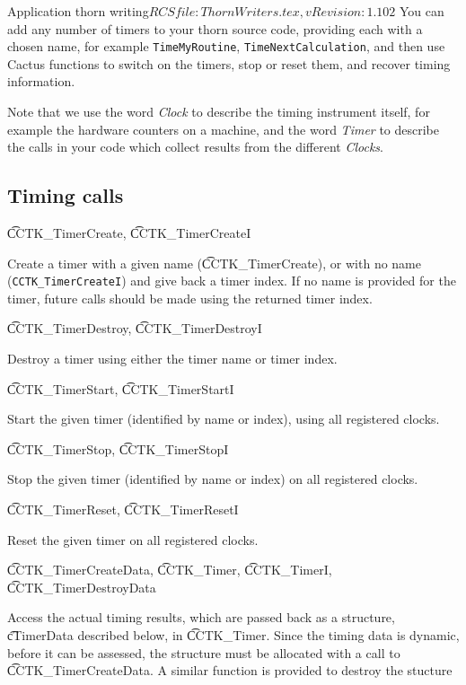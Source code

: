 \begin{cactuspart}{2}{Application thorn writing}{$RCSfile: ThornWriters.tex,v $}{$Revision: 1.102 $}
You can add any number of timers to your thorn source code, providing
each with a chosen name, for example {\tt TimeMyRoutine}, {\tt TimeNextCalculation}, and then use Cactus functions to switch on the
timers, stop or reset them, and recover timing information.

Note that we use the word {\it Clock} to describe the timing instrument
itself, for example the hardware counters on a machine, and the word
{\it Timer} to describe the calls in your code which collect results
from the different {\it Clocks}.

\subsection{Timing calls}

\begin{Lentry}

\item[{\t CCTK\_TimerCreate}, {\t CCTK\_TimerCreateI}]

Create a timer with a given name ({\t CCTK\_TimerCreate}), or with no name
({\tt CCTK\_TimerCreateI})  and give back a timer index.
If no name is provided for the timer, future calls
should be made using the returned timer index.

\item[{\t CCTK\_TimerDestroy}, {\t CCTK\_TimerDestroyI}]

Destroy a timer using either the timer name or timer index.

\item[{\t CCTK\_TimerStart}, {\t CCTK\_TimerStartI}]

Start the given timer (identified by name or index), using all registered
clocks.

\item[{\t CCTK\_TimerStop}, {\t CCTK\_TimerStopI}]

Stop the given timer (identified by name or index) on all registered clocks.

\item[{\t CCTK\_TimerReset}, {\t CCTK\_TimerResetI}]

Reset the given timer on all registered clocks.

\item[{\t CCTK\_TimerCreateData}, {\t CCTK\_Timer}, {\t CCTK\_TimerI}, {\t CCTK\_TimerDestroyData}]

Access the actual timing results, which are passed back as a
structure, {\t cTimerData} described below, in {\t CCTK\_Timer}.
Since the timing data is dynamic, before it can be assessed, the structure
must be allocated with a call to {\t CCTK\_TimerCreateData}. A similar function
is provided to destroy the stucture


\end{Lentry}
\end{cactuspart}
